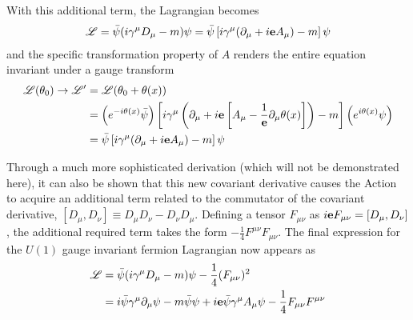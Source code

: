     With this additional term, the Lagrangian becomes
    \begin{equation} \begin{split}
    \mathscr{L} = \bar{\psi} (i\gamma^\mu D_\mu - m) \psi
        = \bar{\psi} \left[i\gamma^\mu(\partial_\mu + i \mathbf{e} A_\mu) - m\right] \psi
    \end{split} \end{equation}
    and the specific transformation property of $A$ renders the entire equation invariant under a gauge transform
    \begin{equation} \begin{split}
    \mathscr{L}(\theta_0) \to \mathscr{L}' &= \mathscr{L}(\theta_0+\theta(x))
        \\&= \left( e^{-i\theta(x)} \bar{\psi} \right) 
        \left[i\gamma^\mu \left(\partial_\mu 
            + i \mathbf{e} \left[A_\mu - \frac{1}{\mathbf{e}} \partial_\mu \theta(x)\right] \right) 
            - m\right]
        \left( e^{i\theta(x)}\psi \right)
        \\&= \bar{\psi} \left[i\gamma^\mu(\partial_\mu + i \mathbf{e} A_\mu) - m\right] \psi
    \end{split} \end{equation}

    Through a much more sophisticated derivation (which will not be demonstrated here),
        it can also be shown that this new covariant derivative causes the Action to acquire an additional term 
        related to the commutator of the covariant derivative, $[D_\mu, D_\nu] \equiv D_\mu D_\nu - D_\nu D_\mu$.
    Defining a tensor $F_{\mu\nu}$ as $i\mathbf{e} F_{\mu\nu} = [D_\mu, D_\nu]$,
        the additional required term takes the form $-\frac{1}{4}F^{\mu\nu}F_{\mu\nu}$.
    The final expression for the $U(1)$ gauge invariant fermion Lagrangian now appears as
    \begin{equation} \label{eq:qedL} \begin{split}
        \mathscr{L} &= \bar{\psi} (i\gamma^\mu D_\mu - m) \psi - \frac{1}{4}(F_{\mu\nu})^2
        \\&= i \bar{\psi} \gamma^\mu \partial_\mu \psi
            - m \bar{\psi} \psi
            + i \mathbf{e} \bar{\psi} \gamma^\mu A_\mu \psi
            - \frac{1}{4}F_{\mu\nu}F^{\mu\nu}
    \end{split} \end{equation}


